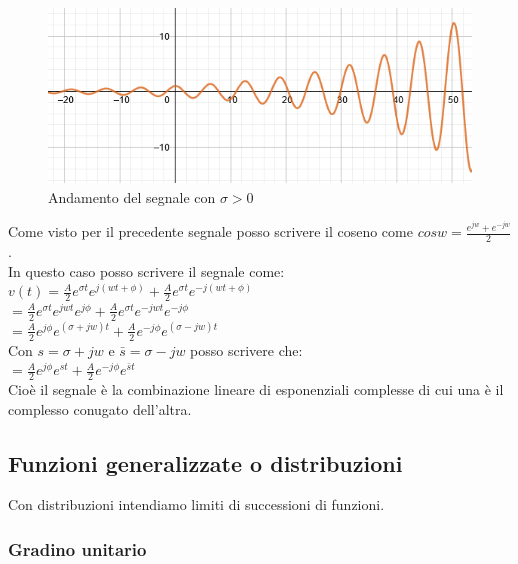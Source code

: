 \pagebreak

\begin{figure}[h]
	\centering
	\includegraphics[scale=0.75]{immagini/segnSinPos}
	\caption{ Andamento del segnale con $ \sigma >0$ }
	\label{fig: segnSinPos}
\end{figure}

Come visto per il precedente segnale posso scrivere il coseno come $  cosw = \frac{e^{jw} + e^{-jw}}{2}  $.\\
In questo caso posso scrivere il segnale come:\\
$ v(t)= \frac{A}{2} e^{ \sigma t} e^{j(wt+ \phi)} + \frac{A}{2} e^{ \sigma t} e^{-j(wt+ \phi)}$\\
$= \frac{A}{2} e^{ \sigma t} e^{ jwt} e^{j \phi} + \frac{A}{2} e^{ \sigma t} e^{ -jwt} e^{-j \phi}$\\
$= \frac{A}{2} e^{j \phi} e^{( \sigma + jw) t} + \frac{A}{2} e^{-j \phi} e^{( \sigma - jw) t}$\\
Con $ s = \sigma + jw $ e $ \bar{s} = \sigma - jw $ posso scrivere che:\\
$= \frac{A}{2} e^{j \phi} e^{st} + \frac{A}{2} e^{-j \phi} e^{\bar{s} t}$\\
Cioè il segnale è la combinazione lineare di esponenziali complesse di cui una è il complesso conugato dell'altra.\\
 

\subsection{Funzioni generalizzate o distribuzioni}

Con distribuzioni intendiamo limiti di successioni di funzioni.\\

\subsubsection{Gradino unitario}
	
